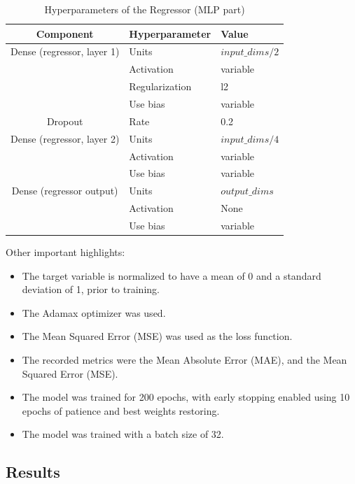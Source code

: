 \documentclass[sigconf,natbib=false]{acmart}
\begin{document}
\begin{table}
  \caption{Hyperparameters of the Regressor (MLP part)}
  \label{tab:hyperparams_regressor}
  \begin{tabular}{cll}
    \toprule
    Component & Hyperparameter & Value \\
    \midrule
    Dense (regressor, layer 1) & Units & $input\_dims/2$ \\
                               & Activation & variable \\
                               & Regularization & l2 \\
                               & Use bias & variable \\
    Dropout & Rate & 0.2 \\
    Dense (regressor, layer 2) & Units & $input\_dims/4$ \\
                               & Activation & variable \\
                               & Use bias & variable \\
    Dense (regressor output) & Units & $output\_dims$ \\
                             & Activation & None \\
                             & Use bias & variable \\
    \bottomrule
  \end{tabular}
\end{table}

Other important highlights:

\begin{itemize}
\item The target variable is normalized to have a mean of 0 and a standard deviation of 1, prior to training.
\item The Adamax optimizer was used.
\item The Mean Squared Error (MSE) was used as the loss function.
\item The recorded metrics were the Mean Absolute Error (MAE), and the Mean Squared Error (MSE).
\item The model was trained for 200 epochs, with early stopping enabled using 10 epochs of patience and best weights restoring.
\item The model was trained with a batch size of 32.
\end{itemize}

\subsection{Results}
\end{document}
